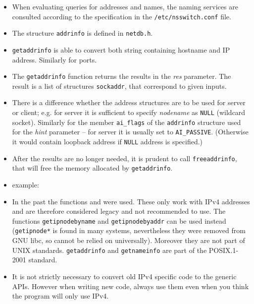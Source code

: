 \begin{itemize}
\item When evaluating queries for addresses and names, the naming services
are consulted according to the specification in the \texttt{/etc/nsswitch.conf}
file.
\item The structure \texttt{addrinfo} is defined in \texttt{netdb.h}.
\item \texttt{getaddrinfo} is able to convert both string containing hostname
and IP address. Similarly for ports.
\item The \texttt{getaddrinfo} function returns the results in the \emph{res}
parameter. The result is a list of structures \texttt{sockaddr}, that correspond
to given inputs.
\item There is a difference whether the address structures are to be used for
server or client; e.g. for server it is sufficient to specify \emph{nodename} as
\texttt{NULL} (wildcard socket). Similarly for the member \texttt{ai\_flags} of
the \texttt{addrinfo} structure used for the \emph{hint} parameter -- for server
it is usually set to \texttt{AI\_PASSIVE}. (Otherwise it would contain loopback
address if \texttt{NULL} address is specified.)
\item After the results are no longer needed, it is prudent to call
\texttt{freeaddrinfo}, that will free the memory allocated by
\texttt{getaddrinfo}.
\item \label{GETADDRINFO} example: 
\item In the past the functions  and
 were used. These only work with IPv4 addresses and are
therefore considered legacy and not recommended to use. The functions
\texttt{getipnodebyname} and \texttt{getipnodebyaddr} can be used instead
(\texttt{getipnode*} is found in many systems, nevertheless they were removed
from GNU libc, so cannot be relied on universally). Moreover they are not
part of UNIX standards.
\texttt{get\-addr\-info} and \texttt{getnameinfo} are part of the POSIX.1-2001
standard.
\item It is not strictly necessary to convert old IPv4 specific code to the
generic APIs. However when writing new code, always use them even when you
think the program will only use IPv4.
\end{itemize}





